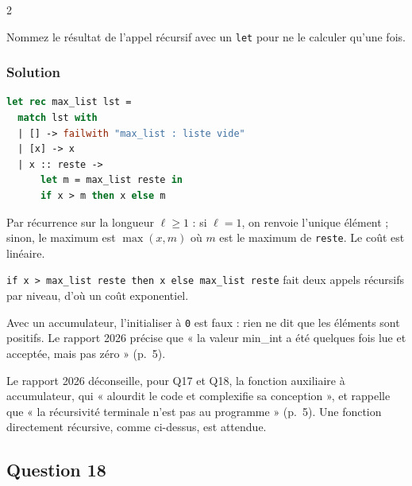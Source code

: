 \documentclass[11pt,a4paper]{article}
\begin{document}
\begin{indication}{2}

Nommez le résultat de l'appel récursif avec un \texttt{let} pour ne le calculer qu'une fois.

\end{indication}

\hypertarget{solution-16}{%
\subsubsection{Solution}\label{solution-16}}

\begin{lstlisting}[language=Caml]
let rec max_list lst =
  match lst with
  | [] -> failwith "max_list : liste vide"
  | [x] -> x
  | x :: reste ->
      let m = max_list reste in
      if x > m then x else m
\end{lstlisting}

Par récurrence sur la longueur \(\ell \ge 1\) : si \(\ell = 1\), on renvoie l'unique élément ; sinon, le maximum est \(\max(x, m)\) où \(m\) est le maximum de \texttt{reste}. Le coût est linéaire.

\begin{piege}

\texttt{if\ x\ \textgreater{}\ max\_list\ reste\ then\ x\ else\ max\_list\ reste} fait deux appels récursifs par niveau, d'où un coût exponentiel.

\end{piege}

\begin{piege}

Avec un accumulateur, l'initialiser à \texttt{0} est faux : rien ne dit que les éléments sont positifs. Le rapport 2026 précise que « la valeur min\_int a été quelques fois lue et acceptée, mais pas zéro » (p.~5).

\end{piege}

\begin{jury}

Le rapport 2026 déconseille, pour Q17 et Q18, la fonction auxiliaire à accumulateur, qui « alourdit le code et complexifie sa conception », et rappelle que « la récursivité terminale n'est pas au programme » (p.~5). Une fonction directement récursive, comme ci-dessus, est attendue.

\end{jury}

\hypertarget{question-18}{%
\subsection{Question 18}\label{question-18}}
\end{document}
